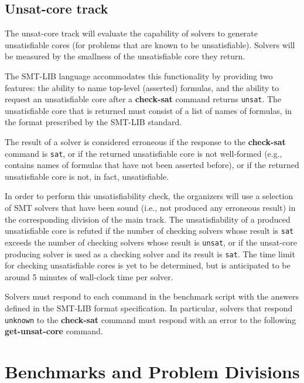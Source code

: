 \documentclass[12pt]{article}
\newcommand{\akey}[1]{\textbf{#1}}
\begin{document}
\subsection{Unsat-core track}
\label{sec:exec:unsat-core}

The unsat-core track will evaluate the capability of solvers to
generate unsatisfiable cores (for problems that are known to be
unsatisfiable).  Solvers will be measured by the smallness of the
unsatisfiable core they return.

The SMT-LIB language accommodates this functionality by providing two
features: the ability to name top-level (asserted) formulas, and the
ability to request an unsatisfiable core after a \akey{check-sat}
command returns \texttt{unsat}.  The unsatisfiable core that is
returned must consist of a list of names of formulas, in the format
prescribed by the SMT-LIB standard.

The result of a solver is considered erroneous if the response to the
\akey{check-sat} command is \texttt{sat}, or if the returned
unsatisfiable core is not well-formed (e.g., contains names of
formulas that have not been asserted before), or if the returned
unsatisfiable core is not, in fact, unsatisfiable.

In order to perform this unsatisfiability check, the organizers will
use a selection of SMT solvers that have been sound (i.e., not
produced any erroneous result) in the corresponding division of the
main track.  The unsatisfiability of a produced unsatisfiable core is
refuted if the number of checking solvers whose result is \texttt{sat}
exceeds the number of checking solvers whose result is \texttt{unsat},
or if the unsat-core producing solver is used as a checking solver and
its result is \texttt{sat}.  The time limit for checking unsatisfiable
cores is yet to be determined, but is anticipated to be around 5
minutes of wall-clock time per solver.

Solvers must respond to each command in the benchmark script with the
answers defined in the SMT-LIB format specification.  In particular,
solvers that respond \texttt{unknown} to the \akey{check-sat} command
must respond with an error to the following \akey{get-unsat-core}
command.


\section{Benchmarks and Problem Divisions}
\end{document}
